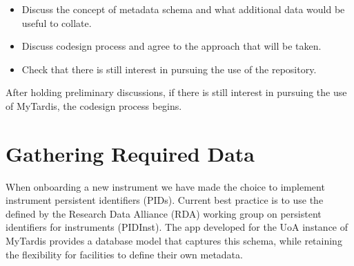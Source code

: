 \documentclass[letterpaper,10pt,english]{sphinxmanual}
\begin{document}
\begin{itemize}
\begin{itemize}
\item {}
\sphinxAtStartPar
Discuss the concept of metadata schema and what additional data would be useful to collate.

\item {}
\sphinxAtStartPar
Discuss co\sphinxhyphen{}design process and agree to the approach that will be taken.

\item {}
\sphinxAtStartPar
Check that there is still interest in pursuing the use of the repository.

\end{itemize}

\end{itemize}

\sphinxAtStartPar
After holding preliminary discussions, if there is still interest in pursuing the use of MyTardis, the co\sphinxhyphen{}design process begins.


\section{Gathering Required Data}
\label{\detokenize{index:gathering-required-data}}\label{\detokenize{index:gathering-data}}
\sphinxAtStartPar
When onboarding a new instrument we have made the choice to implement instrument persistent identifiers (PIDs). Current best practice is to use the  defined by the Research Data Alliance (RDA) working group on persistent identifiers for instruments (PIDInst). The  app developed for the UoA instance of MyTardis provides a database model that captures this schema, while retaining the flexibility for facilities to define their own metadata.
\end{document}
